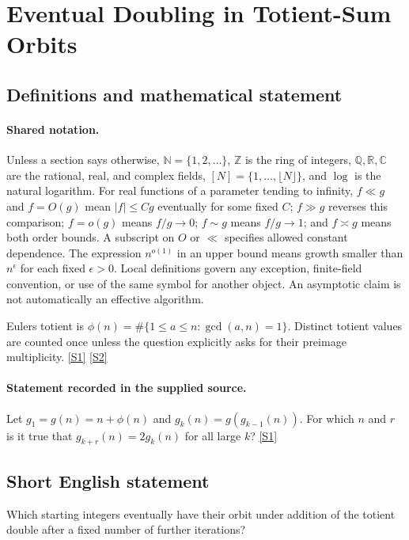 \documentclass[11pt,a4paper]{article}
\newcommand{\N}{\mathbb{N}}
\newcommand{\Z}{\mathbb{Z}}
\newcommand{\Q}{\mathbb{Q}}
\newcommand{\R}{\mathbb{R}}
\newcommand{\C}{\mathbb{C}}
\newcommand{\sref}[2]{\hyperlink{source:#1:#2}{[S#2]}}
\begin{document}
\section{Eventual Doubling in Totient-Sum Orbits}\label{statement}


\subsection{Definitions and mathematical statement}

\paragraph{Shared notation.}Unless a section says otherwise, $\N=\{1,2,\ldots\}$,
$\Z$ is the ring of integers, $\Q,\R,\C$ are the rational, real, and complex
fields, $[N]=\{1,\ldots,\lfloor N\rfloor\}$, and $\log$ is the natural
logarithm. For real functions of a parameter tending to infinity,
$f\ll g$ and $f=O(g)$ mean $|f|\leq Cg$ eventually for some fixed $C$;
$f\gg g$ reverses this comparison; $f=o(g)$ means $f/g\to0$;
$f\sim g$ means $f/g\to1$; and $f\asymp g$ means both order bounds.
A subscript on $O$ or $\ll$ specifies allowed constant dependence.
The expression $n^{o(1)}$ in an upper bound means growth smaller than
$n^\epsilon$ for each fixed $\epsilon>0$. Local definitions govern any
exception, finite-field convention, or use of the same symbol for another
object. An asymptotic claim is not automatically an effective algorithm.



Euler\textquotesingle s totient is $\phi(n)=\#\{1\leq a\leq n:\gcd(a,n)=1\}$. Distinct totient values are counted once unless the question explicitly asks for their preimage multiplicity. \sref{statement}{1} \sref{statement}{2}

\paragraph{Statement recorded in the supplied source.}
Let $g_1=g(n)=n+\phi(n)$ and $g_k(n)=g(g_{k-1}(n))$. For which $n$ and $r$ is it true that $g_{k+r}(n)=2g_k(n)$ for all large $k$? \sref{statement}{1}

\subsection{Short English statement}

Which starting integers eventually have their orbit under addition of the totient double after a fixed number of further iterations?
\end{document}
